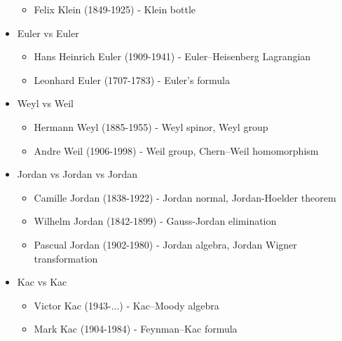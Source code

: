 \documentclass[10pt,a4paper]{book}
\theoremstyle{definition}
\begin{document}
\begin{itemize}
\begin{itemize}
    \item {\sc Felix Klein} (1849-1925) - Klein bottle
    \end{itemize}
\item Euler vs Euler
    \begin{itemize}
    \item {\sc Hans Heinrich Euler} (1909-1941) - Euler–Heisenberg Lagrangian
    \item {\sc Leonhard Euler} (1707-1783) - Euler's formula
    \end{itemize}
\item Weyl vs Weil
    \begin{itemize}
    \item {\sc Hermann Weyl} (1885-1955) - Weyl spinor, Weyl group
    \item {\sc Andre Weil} (1906-1998) - Weil group, Chern–Weil homomorphism
    \end{itemize}
\item Jordan vs Jordan vs Jordan
    \begin{itemize}
    \item {\sc Camille Jordan} (1838-1922) - Jordan normal, Jordan-Hoelder theorem
    \item {\sc Wilhelm Jordan} (1842-1899) - Gauss-Jordan elimination
    \item {\sc Pascual Jordan} (1902-1980) - Jordan algebra, Jordan Wigner transformation
    \end{itemize}
\item Kac vs Kac
    \begin{itemize}
    \item {\sc Victor Kac} (1943-...) - Kac–Moody algebra
    \item {\sc Mark Kac} (1904-1984) - Feynman–Kac formula
    \end{itemize}
\end{itemize}
\end{document}
